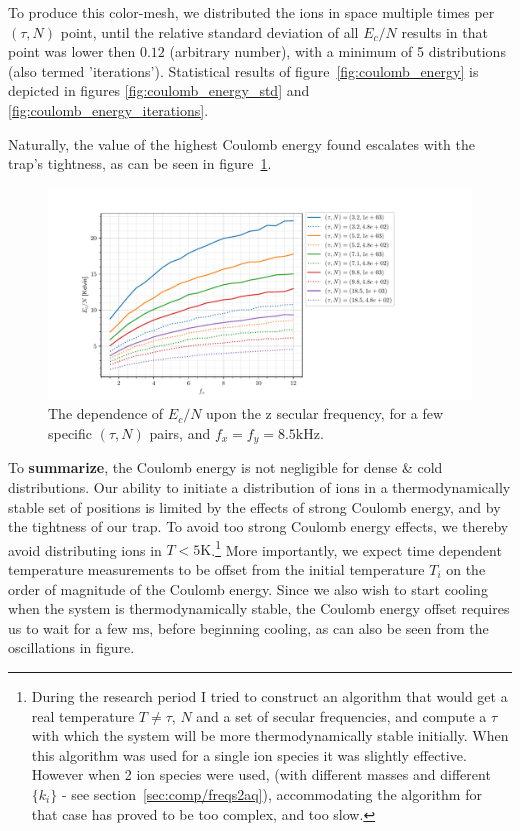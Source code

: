 To produce this color-mesh, we distributed the ions in space multiple times per $(\tau,N)$ point, until the relative standard deviation of all $E_c/N$ results in that point was lower then $0.12$ (arbitrary number), with a minimum of 5 distributions (also termed 'iterations'). Statistical results of figure~\ref{fig:coulomb_energy} is depicted in figures \ref{fig:coulomb_energy_std} and \ref{fig:coulomb_energy_iterations}.

Naturally, the value of the highest Coulomb energy found escalates with the trap's tightness, as can be seen in figure~\ref{fig:coulomb_energy_f_z}.

\begin{figure}
	\begin{center}
		\includegraphics[width=1.2\textwidth]{graphics/coulomb_energy_f_z.pdf}
	\end{center}
	\caption{The dependence of $E_c/N$ upon the z secular frequency, for a few specific $(\tau,N)$ pairs, and $f_x = f_y = 8.5\mathrm{kHz}$.}\label{fig:coulomb_energy_f_z}
\end{figure}

To \textbf{summarize}, the Coulomb energy is not negligible for dense \& cold distributions. Our ability to initiate a distribution of ions in a thermodynamically stable set of positions is limited by the effects of strong Coulomb energy, and by the tightness of our trap. To avoid too strong Coulomb energy effects, we thereby avoid distributing ions in $T < 5\mathrm{K}$.\footnote{During the research period I tried to construct an algorithm that would get a real temperature $T \ne \tau$, $N$ and a set of secular frequencies, and compute a $\tau$ with which the system will be more thermodynamically stable initially. When this algorithm was used for a single ion species it was slightly effective. However when 2 ion species were used, (with different masses and different $\{k_i\}$ - see section~\ref{sec:comp/freqs2aq}), accommodating the algorithm for that case has proved to be too complex, and too slow.} More importantly, we expect time dependent temperature measurements to be offset from the initial temperature $T_i$ on the order of magnitude of the Coulomb energy. Since we also wish to start cooling when the system is thermodynamically stable, the Coulomb energy offset requires us to wait for a few $\mathrm{ms}$, before beginning cooling, as can also be seen from the oscillations in figure. %

